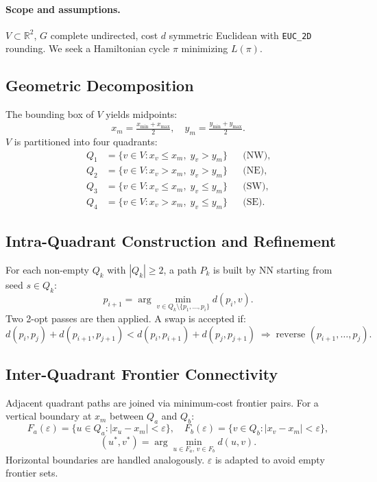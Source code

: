\documentclass[runningheads]{llncs}
\begin{document}
\paragraph{Scope and assumptions.}
$V\subset\mathbb{R}^2$, $G$ complete undirected, cost $d$ symmetric
Euclidean with \texttt{EUC\_2D} rounding. We seek a Hamiltonian
cycle $\pi$ minimizing $L(\pi)$.

\subsection{Geometric Decomposition}

The bounding box of $V$ yields midpoints:
\begin{equation}
x_m=\tfrac{x_{\min}+x_{\max}}{2}, \quad
y_m=\tfrac{y_{\min}+y_{\max}}{2}.
\end{equation}
$V$ is partitioned into four quadrants:
\begin{align}
Q_1&=\{v\in V: x_v\le x_m,\; y_v>y_m\}  &&\text{(NW)},\\
Q_2&=\{v\in V: x_v>x_m,\; y_v>y_m\}    &&\text{(NE)},\\
Q_3&=\{v\in V: x_v\le x_m,\; y_v\le y_m\}&&\text{(SW)},\\
Q_4&=\{v\in V: x_v>x_m,\; y_v\le y_m\} &&\text{(SE)}.
\end{align}

\subsection{Intra-Quadrant Construction and Refinement}

For each non-empty $Q_k$ with $|Q_k|\ge 2$, a path $P_k$ is built
by NN starting from seed $s\in Q_k$:
\begin{equation}
p_{i+1}=\arg\min_{v\in Q_k\setminus\{p_1,\dots,p_i\}}d(p_i,v).
\end{equation}
Two 2-opt passes are then applied. A swap is accepted if:
\begin{equation}
d(p_i,p_j)+d(p_{i+1},p_{j+1})<d(p_i,p_{i+1})+d(p_j,p_{j+1})
\;\Rightarrow\;\text{reverse }(p_{i+1},\dots,p_j).
\end{equation}

\subsection{Inter-Quadrant Frontier Connectivity}

Adjacent quadrant paths are joined via minimum-cost frontier pairs.
For a vertical boundary at $x_m$ between $Q_a$ and $Q_b$:
\begin{equation}
F_a(\varepsilon)=\{u\in Q_a:|x_u-x_m|<\varepsilon\},\quad
F_b(\varepsilon)=\{v\in Q_b:|x_v-x_m|<\varepsilon\},
\end{equation}
\begin{equation}
(u^*,v^*)=\arg\min_{u\in F_a,\,v\in F_b}d(u,v).
\label{eq:frontier}
\end{equation}
Horizontal boundaries are handled analogously.
$\varepsilon$ is adapted to avoid empty frontier sets.
\end{document}
